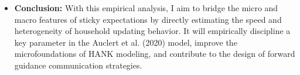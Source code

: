 \documentclass[10pt]{article}
\begin{document}
\begin{itemize}
\item \textbf{Conclusion:}
With this empirical analysis, I aim to bridge the micro and macro features of sticky expectations by directly estimating the speed and heterogeneity of household updating behavior. It will empirically discipline a key parameter in the Auclert et al. (2020) model, improve the microfoundations of HANK modeling, and contribute to the design of forward guidance communication strategies.

\end{itemize}
\end{document}
